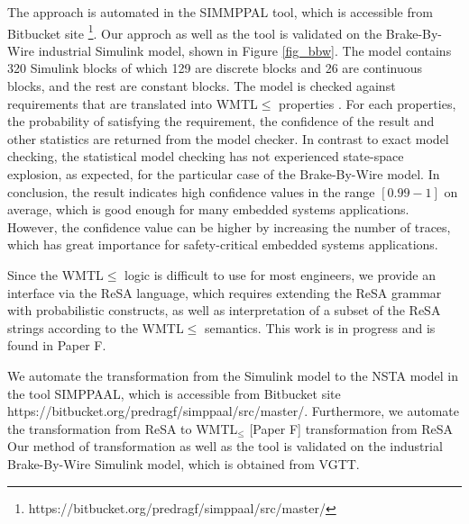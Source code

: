 The approach is automated in the SIMMPPAL tool, which is accessible from Bitbucket site \footnote{https://bitbucket.org/predragf/simppaal/src/master/}. Our approch as well as the tool is validated on the Brake-By-Wire industrial Simulink model, shown in Figure \ref{fig_bbw}. The model contains 320 Simulink blocks of which 129 are discrete blocks and 26 are continuous blocks, and the rest are constant blocks. The model is checked against requirements that are translated into WMTL$\leq$ properties \cite{Filipovikj4714}. For each properties, the probability of satisfying the requirement, the confidence of the result and other statistics are returned from the model checker. In contrast to exact model checking, the statistical model checking has not experienced state-space explosion, as expected, for the particular case of the Brake-By-Wire model. In conclusion, the result indicates high confidence values in the range $[0.99-1]$ on average, which is good enough for many embedded systems applications. However, the confidence value can be higher by increasing the number of traces, which has great importance for safety-critical embedded systems applications.

Since the WMTL$\leq$ logic is difficult to use for most engineers, we provide an interface via the ReSA language, which requires extending the ReSA grammar with probabilistic constructs, as well as interpretation of a subset of the ReSA strings according to the WMTL$\leq$ semantics. This work is in progress and is found in Paper F.

We automate the transformation from the Simulink model to the NSTA model in the tool SIMPPAAL, which is accessible from Bitbucket site {\small https://bitbucket.org/predragf/simppaal/src/master/}. Furthermore, we automate the transformation from ReSA to WMTL$_\leq$ [Paper F] transformation from ReSA Our method of transformation as well as the tool is validated on the industrial Brake-By-Wire Simulink model, which is obtained from VGTT. 


